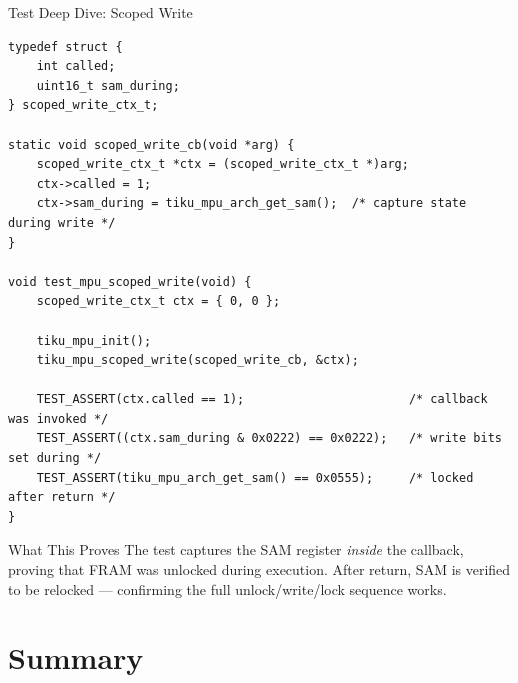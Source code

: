 \documentclass[aspectratio=169, 10pt]{beamer}
\begin{document}
\begin{frame}[fragile]{Test Deep Dive: Scoped Write}
\begin{lstlisting}[style=cstyle, title={test\_tiku\_mem.c --- Scoped write test}]
typedef struct {
    int called;
    uint16_t sam_during;
} scoped_write_ctx_t;

static void scoped_write_cb(void *arg) {
    scoped_write_ctx_t *ctx = (scoped_write_ctx_t *)arg;
    ctx->called = 1;
    ctx->sam_during = tiku_mpu_arch_get_sam();  /* capture state during write */
}

void test_mpu_scoped_write(void) {
    scoped_write_ctx_t ctx = { 0, 0 };

    tiku_mpu_init();
    tiku_mpu_scoped_write(scoped_write_cb, &ctx);

    TEST_ASSERT(ctx.called == 1);                       /* callback was invoked */
    TEST_ASSERT((ctx.sam_during & 0x0222) == 0x0222);   /* write bits set during */
    TEST_ASSERT(tiku_mpu_arch_get_sam() == 0x0555);     /* locked after return */
}
\end{lstlisting}

\vspace{0.3em}
\begin{block}{What This Proves}
The test captures the SAM register \emph{inside} the callback, proving
that FRAM was unlocked during execution. After return, SAM is verified
to be relocked --- confirming the full unlock/write/lock sequence works.
\end{block}
\end{frame}

\section{Summary}
\end{document}
